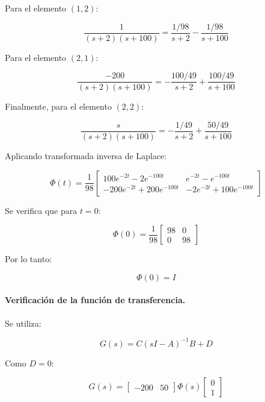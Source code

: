 \documentclass[12pt,a4paper]{article}
\begin{document}
Para el elemento $(1,2)$:

\begin{equation}\frac{1}{(s+2)(s+100)}=\frac{1/98}{s+2}-\frac{1/98}{s+100}\end{equation}

Para el elemento $(2,1)$:

\begin{equation}\frac{-200}{(s+2)(s+100)}=-\frac{100/49}{s+2}+\frac{100/49}{s+100}\end{equation}

Finalmente, para el elemento $(2,2)$:

\begin{equation}\frac{s}{(s+2)(s+100)}=-\frac{1/49}{s+2}+\frac{50/49}{s+100}\end{equation}

Aplicando transformada inversa de Laplace:

\begin{equation}\boxed{\Phi(t)=\frac{1}{98} \begin{bmatrix}100e^{-2t}-2e^{-100t}&e^{-2t}-e^{-100t}\\[6pt]-200e^{-2t}+200e^{-100t}&-2e^{-2t}+100e^{-100t}\end{bmatrix}}\end{equation}

Se verifica que para $t=0$:

\begin{equation}\Phi(0)=\frac{1}{98} \begin{bmatrix}98&0\\0&98\end{bmatrix}\end{equation}

Por lo tanto:

\begin{equation}\boxed{\Phi(0)=I}\end{equation}
\paragraph{Verificación de la función de transferencia.} Se utiliza:

\begin{equation}G(s)=C(sI-A)^{-1}B+D\end{equation}

Como $D=0$:

\begin{equation}G(s)=\begin{bmatrix}-200&50\end{bmatrix} \Phi(s) \begin{bmatrix}0\\1\end{bmatrix}\end{equation}
\end{document}
